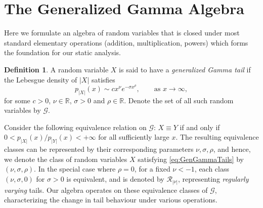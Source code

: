 \documentclass{article}
\theoremstyle{definition}
\newtheorem{definition}{Definition}
\begin{document}
\section{The Generalized Gamma Algebra}\label{sec:gga}

Here we formulate an algebra of random variables that is closed under most standard elementary operations (addition, multiplication, powers) which forms the foundation for our static analysis.

\begin{definition}\label{def:gg_tail}
A random variable $X$ is said to have a \emph{generalized Gamma tail} if the Lebesgue density of $|X|$ satisfies
\begin{equation}
\label{eq:GenGammaTails}
p_{|X|}(x) \sim c x^\nu e^{-\sigma x^\rho}, \qquad \text{as } x \to \infty,
\end{equation}
for some $c > 0$, $\nu \in \mathbb{R}$, $\sigma > 0$ and $\rho \in \mathbb{R}$. Denote the set of all such random variables by $\mathcal{G}$.
\end{definition}
Consider the following equivalence relation on $\mathcal{G}$: $X \equiv Y$ if and only if $0 < p_{|X|}(x) / p_{|Y|}(x) < +\infty$ for all sufficiently large $x$. The resulting equivalence classes can be represented by their corresponding parameters $\nu, \sigma, \rho$, and hence, we denote the class of random variables $X$ satisfying \cref{eq:GenGammaTails} by $(\nu,\sigma,\rho)$. In the special case where $\rho = 0$, for a fixed $\nu < -1$, each class $(\nu,\sigma,0)$ for $\sigma > 0$ is equivalent, and is denoted by $\mathcal{R}_{|\nu|}$, representing \emph{regularly varying} tails. Our algebra operates on these equivalence classes of $\mathcal{G}$, characterizing the change in tail behaviour under various operations.
\end{document}
